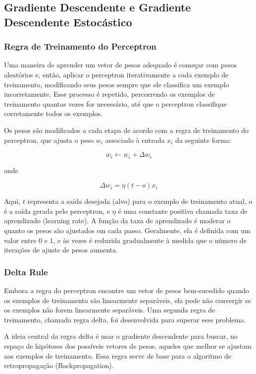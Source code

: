 \documentclass{article}
\begin{document}
\subsection{Gradiente Descendente e Gradiente Descendente Estocástico}
\subsubsection{Regra de Treinamento do Perceptron}
Uma maneira de aprender um vetor de pesos adequado é começar com pesos aleatórios e, então, aplicar o perceptron iterativamente a cada exemplo de treinamento, modificando seus pesos sempre que ele classifica um exemplo incorretamente. Esse processo é repetido, percorrendo os exemplos de treinamento quantas vezes for necessário, até que o perceptron classifique corretamente todos os exemplos.

Os pesos são modificados a cada etapa de acordo com a regra de treinamento do perceptron, que ajusta o peso $w_i$ associado à entrada $x_i$ da seguinte forma:

\begin{equation}
w_i \leftarrow w_i + \Delta w_i
\end{equation}

onde

\begin{equation}
\Delta w_i = \eta (t - o)x_i
\end{equation}

Aqui, $t$ representa a saída desejada (alvo) para o exemplo de treinamento atual, $o$ é a saída gerada pelo perceptron, e $\eta$ é uma constante positiva chamada taxa de aprendizado (learning rate).
A função da taxa de aprendizado é moderar o quanto os pesos são ajustados em cada passo. Geralmente, ela é definida com um valor entre 0 e 1, e às vezes é reduzida gradualmente à medida que o número de iterações de ajuste de pesos aumenta.

\subsubsection{Delta Rule}
Embora a regra do perceptron encontre um vetor de pesos bem-sucedido quando os exemplos de treinamento são linearmente separáveis, ela pode não convergir se os exemplos não forem linearmente separáveis. Uma segunda regra de treinamento, chamada regra delta, foi desenvolvida para superar esse problema.

A ideia central da regra delta é usar o gradiente descendente para buscar, no espaço de hipóteses dos possíveis vetores de pesos, aqueles que melhor se ajustam aos exemplos de treinamento. Essa regra serve de base para o algoritmo de retropropagação (Backpropagation).
\end{document}
